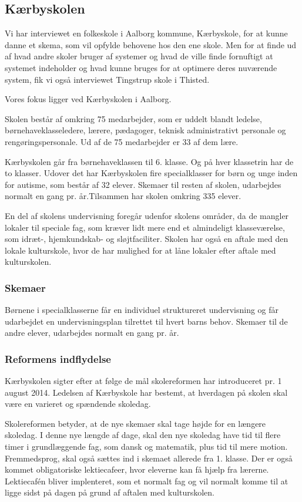 \subsection{Kærbyskolen}
\label{Kaerbyskolen}
Vi har interviewet en folkeskole i Aalborg kommune, Kærbyskole, for at kunne danne et skema, som vil opfylde behovene hos den ene skole. Men for at finde ud af hvad andre skoler bruger af systemer og hvad de ville finde fornuftigt at systemet indeholder og hvad kunne bruges for at optimere deres nuværende system, fik vi også interviewet Tingstrup skole i Thisted.

Vores fokus ligger ved Kærbyskolen i Aalborg.

Skolen består af omkring 75 medarbejder, som er uddelt blandt ledelse, børnehaveklasseledere, lærere, pædagoger, teknisk administrativt personale og rengøringspersonale. Ud af de 75 medarbejder er 33 af dem lære.

Kærbyskolen går fra børnehaveklassen til 6. klasse. Og på hver klassetrin har de to klasser. Udover det har Kærbyskolen fire specialklasser for børn og unge inden for autisme, som består af 32 elever. Skemaer til resten af skolen, udarbejdes normalt en gang pr. år.Tilsammen har skolen omkring 335 elever.

En del af skolens undervisning foregår udenfor skolens områder, da de mangler lokaler til speciale fag, som kræver lidt mere end et almindeligt klasseværelse, som idræt-, hjemkundskab- og sløjtfaciliter. Skolen har også en aftale med den lokale kulturskole, hvor de har mulighed for at låne lokaler efter aftale med kulturskolen.

\subsubsection{Skemaer}
\label{Skemaer}
Børnene i specialklasserne får en individuel struktureret undervisning og får udarbejdet en undervisningsplan tilrettet til hvert barns behov\cite{j_klasser}.
Skemaer til de andre elever, udarbejdes normalt en gang pr. år.

\subsubsection{Reformens indflydelse}
\label{Reformens_indflydelse}
Kærbyskolen sigter efter at følge de mål skolereformen har introduceret pr. 1 august 2014. Ledelsen af Kærbyskole har bestemt, at hverdagen på skolen skal være en varieret og spændende skoledag.

Skolereformen betyder, at de nye skemaer skal tage højde for en længere skoledag. I denne nye længde af dage, skal den nye skoledag have tid til flere timer i grundlæggende fag, som dansk og matematik, plus tid til mere motion. Fremmedsprog, skal også sættes ind i skemaet allerede fra 1. klasse. Der er også kommet obligatoriske lektiecafeer, hvor eleverne kan få hjælp fra lærerne. Lektiecafén bliver implenteret, som et normalt fag og vil normalt komme til at ligge sidst på dagen på grund af aftalen med kulturskolen\cite{kaerby_skolereform}.

